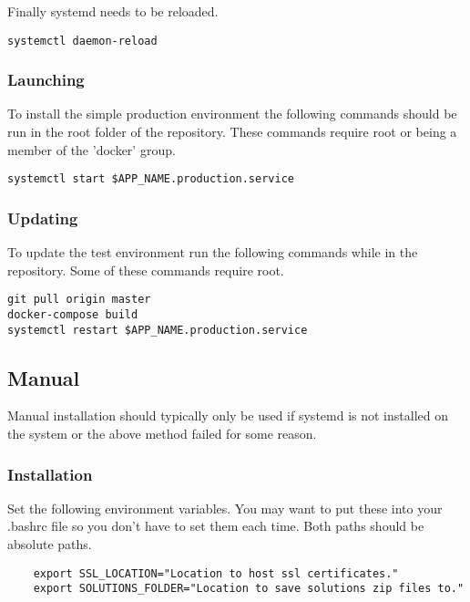 Finally systemd needs to be reloaded.

\begin{verbatim}
systemctl daemon-reload
\end{verbatim}

\subsubsection{Launching}

To install the simple production environment the following commands should be run in the root folder of the repository.  These commands require root or being a member of the 'docker' group.

\begin{verbatim}
systemctl start $APP_NAME.production.service
\end{verbatim}

\subsubsection{Updating}

To update the test environment run the following commands while in the repository.  Some of these commands require root.

\begin{verbatim}
git pull origin master
docker-compose build
systemctl restart $APP_NAME.production.service
\end{verbatim}

\subsection{Manual}

Manual installation should typically only be used if systemd is not installed on the system or the above method failed for some reason.

\subsubsection{Installation}

Set the following environment variables.  You may want to put these into your .bashrc file so you don't have to set them each time.  Both paths should be absolute paths.

\begin{verbatim}
	export SSL_LOCATION="Location to host ssl certificates."
	export SOLUTIONS_FOLDER="Location to save solutions zip files to."
\end{verbatim}

